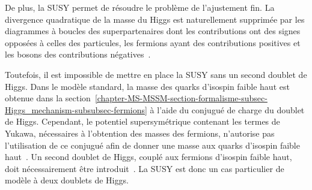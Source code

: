 De plus, la SUSY permet de résoudre le problème de l'ajustement fin.
La divergence quadratique de la masse du Higgs est naturellement supprimée par les diagrammes à boucles des superpartenaires dont les contributions ont des signes opposées à celles des particules, les fermions ayant des contributions positives et les bosons des contributions négatives~\cite{Higgs_hunter_guide}.
\par Toutefois, il est impossible de mettre en place la SUSY sans un second doublet de Higgs.
Dans le modèle standard, la masse des quarks d'isospin faible haut est obtenue dans la section~\ref{chapter-MS-MSSM-section-formalisme-subsec-Higgs_mechanism-subsubsec-fermions} à l'aide du conjugué de charge du doublet de Higgs.
Cependant, le potentiel supersymétrique contenant les termes de Yukawa, nécessaires à l'obtention des masses des fermions, n'autorise pas l'utilisation de ce conjugué afin de donner une masse aux quarks d'isospin faible haut~\cite{Nagashima_BSM}.
Un second doublet de Higgs, couplé aux fermions d'isospin faible haut, doit nécessairement être introduit~\cite{Nagashima_BSM,Higgs_hunter_guide}.
La SUSY est donc un cas particulier de modèle à deux doublets de Higgs.
